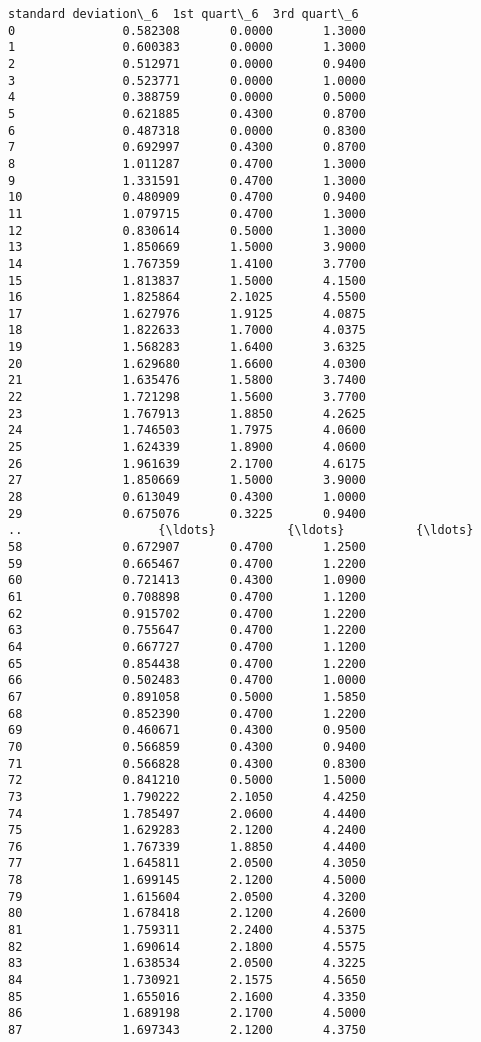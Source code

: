 \documentclass[11pt]{article}
\begin{document}
\begin{Verbatim}[commandchars=\\\{\}]
    standard deviation\_6  1st quart\_6  3rd quart\_6  
0               0.582308       0.0000       1.3000  
1               0.600383       0.0000       1.3000  
2               0.512971       0.0000       0.9400  
3               0.523771       0.0000       1.0000  
4               0.388759       0.0000       0.5000  
5               0.621885       0.4300       0.8700  
6               0.487318       0.0000       0.8300  
7               0.692997       0.4300       0.8700  
8               1.011287       0.4700       1.3000  
9               1.331591       0.4700       1.3000  
10              0.480909       0.4700       0.9400  
11              1.079715       0.4700       1.3000  
12              0.830614       0.5000       1.3000  
13              1.850669       1.5000       3.9000  
14              1.767359       1.4100       3.7700  
15              1.813837       1.5000       4.1500  
16              1.825864       2.1025       4.5500  
17              1.627976       1.9125       4.0875  
18              1.822633       1.7000       4.0375  
19              1.568283       1.6400       3.6325  
20              1.629680       1.6600       4.0300  
21              1.635476       1.5800       3.7400  
22              1.721298       1.5600       3.7700  
23              1.767913       1.8850       4.2625  
24              1.746503       1.7975       4.0600  
25              1.624339       1.8900       4.0600  
26              1.961639       2.1700       4.6175  
27              1.850669       1.5000       3.9000  
28              0.613049       0.4300       1.0000  
29              0.675076       0.3225       0.9400  
..                   {\ldots}          {\ldots}          {\ldots}  
58              0.672907       0.4700       1.2500  
59              0.665467       0.4700       1.2200  
60              0.721413       0.4300       1.0900  
61              0.708898       0.4700       1.1200  
62              0.915702       0.4700       1.2200  
63              0.755647       0.4700       1.2200  
64              0.667727       0.4700       1.1200  
65              0.854438       0.4700       1.2200  
66              0.502483       0.4700       1.0000  
67              0.891058       0.5000       1.5850  
68              0.852390       0.4700       1.2200  
69              0.460671       0.4300       0.9500  
70              0.566859       0.4300       0.9400  
71              0.566828       0.4300       0.8300  
72              0.841210       0.5000       1.5000  
73              1.790222       2.1050       4.4250  
74              1.785497       2.0600       4.4400  
75              1.629283       2.1200       4.2400  
76              1.767339       1.8850       4.4400  
77              1.645811       2.0500       4.3050  
78              1.699145       2.1200       4.5000  
79              1.615604       2.0500       4.3200  
80              1.678418       2.1200       4.2600  
81              1.759311       2.2400       4.5375  
82              1.690614       2.1800       4.5575  
83              1.638534       2.0500       4.3225  
84              1.730921       2.1575       4.5650  
85              1.655016       2.1600       4.3350  
86              1.689198       2.1700       4.5000  
87              1.697343       2.1200       4.3750  


\end{Verbatim}
\end{document}
